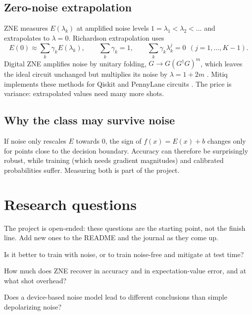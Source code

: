 \documentclass[11pt,a4paper]{article}
\begin{document}
\subsection{Zero-noise extrapolation}
ZNE \citep{temme2017,kandala2019} measures $E(\lambda_k)$ at amplified noise levels
$1=\lambda_1<\lambda_2<\dots$ and extrapolates to $\lambda=0$. Richardson extrapolation uses
\begin{equation}
  E(0)\approx\sum_k\gamma_kE(\lambda_k),\qquad \sum_k\gamma_k=1,\qquad \sum_k\gamma_k\lambda_k^{j}=0\ \ (j=1,\dots,K-1).
\end{equation}
Digital ZNE amplifies noise by unitary folding, $G\to G(G^\dagger G)^m$, which leaves the ideal circuit
unchanged but multiplies its noise by $\lambda=1+2m$ \citep{giurgica2020}. Mitiq implements these
methods for Qiskit and PennyLane circuits \citep{larose2022}. The price is variance: extrapolated values
need many more shots.

\subsection{Why the class may survive noise}
If noise only rescales $E$ towards 0, the sign of $f(x)=E(x)+b$ changes only for points close to the
decision boundary. Accuracy can therefore be surprisingly robust, while training (which needs gradient
magnitudes) and calibrated probabilities suffer. Measuring both is part of the project.

\section{Research questions}
The project is open-ended: these questions are the starting point, not the finish line. Add new
ones to the README and the journal as they come up.

\begin{rqlist}
  \item Is it better to train with noise, or to train noise-free and mitigate at test time?
  \item How much does ZNE recover in accuracy and in expectation-value error, and at what shot overhead?
  \item Does a device-based noise model lead to different conclusions than simple depolarizing noise?
\end{rqlist}
\end{document}
